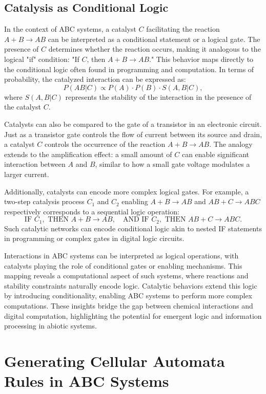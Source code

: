 \documentclass[entropy,article,submit,pdftex,moreauthors]{Definitions/mdpi}
\begin{document}
\subsection{Catalysis as Conditional Logic}

In the context of ABC systems, a catalyst \( C \) facilitating the reaction \( A + B \to AB \) can be interpreted as a conditional statement or a logical gate. The presence of \( C \) determines whether the reaction occurs, making it analogous to the logical "if" condition: "If \( C \), then \( A + B \to AB \)."
This behavior maps directly to the conditional logic often found in programming and computation. In terms of probability, the catalyzed interaction can be expressed as:
\[
P(AB | C) \propto P(A) \cdot P(B) \cdot S(A, B | C),
\]
where \( S(A, B | C) \) represents the stability of the interaction in the presence of the catalyst \( C \).

Catalysts can also be compared to the gate of a transistor in an electronic circuit. Just as a transistor gate controls the flow of current between its source and drain, a catalyst \( C \) controls the occurrence of the reaction \( A + B \to AB \). The analogy extends to the amplification effect: a small amount of \( C \) can enable significant interaction between \( A \) and \( B \), similar to how a small gate voltage modulates a larger current.

Additionally, catalysts can encode more complex logical gates. For example, a two-step catalysis process \( C_1 \) and \( C_2 \) enabling \( A + B \to AB \) and \( AB + C \to ABC \) respectively corresponds to a sequential logic operation:
\[
\text{IF } C_1, \text{ THEN } A + B \to AB, \quad \text{AND IF } C_2, \text{ THEN } AB + C \to ABC.
\]
Such catalytic networks can encode conditional logic akin to nested IF statements in programming or complex gates in digital logic circuits. 

Interactions in ABC systems can be interpreted as logical operations, with catalysts playing the role of conditional gates or enabling mechanisms. This mapping reveals a computational aspect of such systems, where reactions and stability constraints naturally encode logic. Catalytic behaviors extend this logic by introducing conditionality, enabling ABC systems to perform more complex computations. These insights bridge the gap between chemical interactions and digital computation, highlighting the potential for emergent logic and information processing in abiotic systems.

\section{Generating Cellular Automata Rules in ABC Systems}
\end{document}
